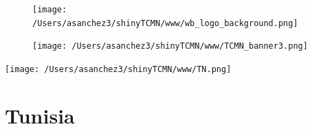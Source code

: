 \documentclass{article}\usepackage[]{graphicx}\usepackage[]{color}
\begin{document}
%

\begin{figure}
  \vspace{-3ex} %
  \hspace{-7ex} %
  \texttt{[image: /Users/asanchez3/shinyTCMN/www/wb\_logo\_background.png]}
\end{figure}
\begin{figure}
  \begin{minipage}[t]{0.99\textwidth} %
      \vspace{-30ex}
      \hspace{-2ex}
      \raggedright{\texttt{[image: /Users/asanchez3/shinyTCMN/www/TCMN\_banner3.png]}}
  \end{minipage}
\end{figure}
%
\begin{minipage}[t]{0.99\textwidth} %
  \vspace{-1.5cm}
  \begin{minipage}[c]{0.36\textwidth} 
    \begin{minipage}[c]{0.28\textwidth} %
      \texttt{[image: /Users/asanchez3/shinyTCMN/www/TN.png]}
    \end{minipage}
    \begin{minipage}[c]{0.70\textwidth} %
      \section*{\color{blue!40!black}Tunisia}
    \end{minipage}
  \end{minipage}
  \begin{minipage}[c]{0.63\textwidth}
  \end{minipage}  
\end{minipage} %
\end{document}
